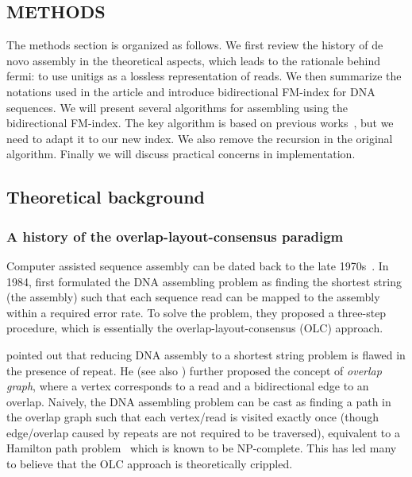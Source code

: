 \documentclass{bioinfo}
\begin{document}
\begin{methods}
\section{METHODS}

The methods section is organized as follows. We first review the history
of de novo assembly in the theoretical aspects, which leads to the rationale
behind fermi: to use unitigs as a lossless representation of reads. We then
summarize the notations used in the article and introduce bidirectional
FM-index for DNA sequences. We will present several algorithms for assembling
using the bidirectional FM-index. The key algorithm is based on previous
works~\citep{Simpson:2010uq}, but we need to adapt it to our new index. We
also remove the recursion in the original algorithm. Finally we will discuss
practical concerns in implementation.

\subsection{Theoretical background}
\subsubsection{A history of the overlap-layout-consensus paradigm}
Computer assisted sequence assembly can be dated back to the late
1970s~\citep{Staden:1979dq,Gingeras:1979cr}. 
In 1984, \citeauthor{Peltola:1984qf} first formulated the DNA assembling
problem as finding the shortest string (the assembly) such that each sequence
read can be mapped to the assembly within a required error rate.
To solve the problem, they proposed a three-step procedure, which is
essentially the overlap-layout-consensus (OLC) approach.

\citet{Myers:1995nx} pointed out that reducing DNA assembly to a shortest
string problem is flawed in the presence of repeat. He (see also
\citealt{DBLP:journals/algorithmica/KececiogluM95}) further proposed the
concept of \emph{overlap graph}, where a vertex corresponds to a read and a
bidirectional edge to an overlap. Naively, the DNA assembling problem can be
cast as finding a path in the overlap graph such that each vertex/read is
visited exactly once (though edge/overlap caused by repeats are not required to
be traversed), equivalent to a Hamilton path
problem~\citep{Compeau:2011fk,Li:2011zr} which is known to be NP-complete. This
has led many to believe that the OLC approach is theoretically crippled.


\end{methods}
\end{document}

